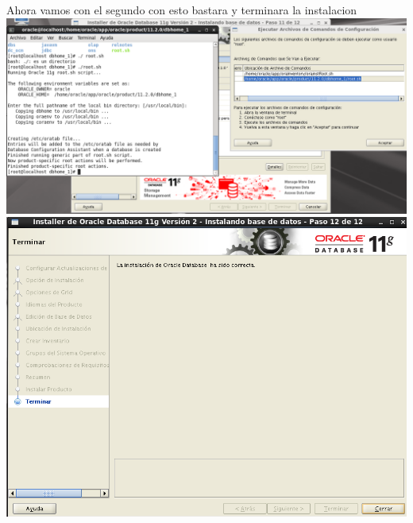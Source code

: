 \documentclass[12pt,letterpaper]{article}
\begin{document}
\begin{center}
Ahora vamos con el segundo  con esto bastara y terminara la instalacion\\
\includegraphics[width=15cm]{./oraclelinux/28.png}\\
\includegraphics[width=15cm]{./oraclelinux/29.png}\\
\end{center}
\end{document}
